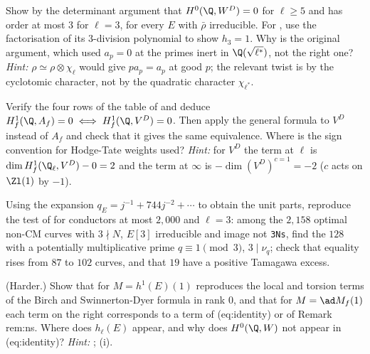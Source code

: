 \begin{exercise}[$h_\ell(E)$]\label{ex:blochkato:ex-h0}
Show by the determinant argument that $H^0(\Q,W^D)=0$ for $\ell\ge5$ and has order at most $3$ for $\ell=3$, for every $E$ with $\bar\rho$ irreducible. For , use the factorisation
of its $3$-division polynomial to show $h_3=1$. Why is the original argument, which used $a_p=0$ at the primes inert in $\Q(\sqrt{\ell^*})$, not the right one?
\emph{Hint:} $\rho\simeq\rho\otimes\chi_\ell$ would give $pa_p=a_p$ at good $p$; the relevant twist is by the cyclotomic character, not by the quadratic character $\chi_{\ell^*}$.
\end{exercise}

\begin{exercise}\label{ex:blochkato:ex-euler}
Verify the four rows of the table of  and deduce $H^1_f(\Q,A_f)=0\iff H^1_f(\Q,V^D)=0$. Then apply the general formula to $V^D$ instead of $A_f$
and check that it gives the same equivalence. Where is the sign convention for Hodge-Tate weights used?
\emph{Hint:} for $V^D$ the term at $\ell$ is $\dim H^1_f(\Q_\ell,V^D)-0=2$ and the term at $\infty$ is $-\dim(V^D)^{c=1}=-2$ ($c$ acts on $\Zl(1)$ by $-1$).
\end{exercise}

\begin{exercise}\label{ex:blochkato:ex-small-range}
Using the expansion $q_E=j^{-1}+744j^{-2}+\cdots$ to obtain the unit parts, reproduce the test of  for conductors at most $2{,}000$ and $\ell=3$: among the
$2{,}158$ optimal non-CM curves with $3\nmid N$, $E[3]$ irreducible and image not \texttt{3Ns}, find the $128$ with a potentially multiplicative prime $q\equiv1\pmod3$, $3\mid\nu_q$; check that
equality rises from $87$ to $102$ curves, and that $19$ have a positive Tamagawa excess.
\end{exercise}

\begin{exercise}\label{ex:blochkato:ex-bsd}
(Harder.) Show that  for $M=h^1(E)(1)$ reproduces the local and torsion terms of the Birch and Swinnerton-Dyer formula in rank $0$, and that for $M=\ad M_f(1)$
each term on the right corresponds to a term of (eq:identity) or of Remark rem:ns. Where does $h_\ell(E)$ appear, and why does $H^0(\Q,W)$ not appear in (eq:identity)?
\emph{Hint:} ; (i).
\end{exercise}

